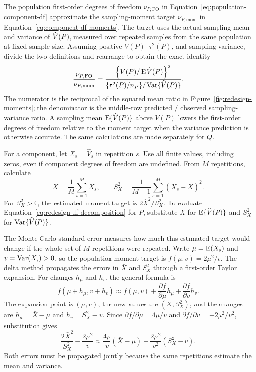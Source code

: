 The population first-order degrees of freedom
\(\nu_{P,\mathrm{FO}}\) in Equation~\eqref{eq:population-component-df}
approximate the sampling-moment target \(\nu_{P,\mathrm{mom}}\) in
Equation~\eqref{eq:component-df-moments}. The target uses the actual
sampling mean and variance of \(\widehat V(P)\), measured over repeated
samples from the same population at fixed sample size. Assuming positive
\(V(P)\), \(\tau^2(P)\), and sampling variance, divide the two
definitions and rearrange to obtain the exact identity
\begin{equation}
 \frac{\nu_{P,\mathrm{FO}}}{\nu_{P,\mathrm{mom}}}
 =\frac{\left\{V(P)/\operatorname{E}\widehat V(P)\right\}^{2}}
        {\{\tau^2(P)/n_P\}/\operatorname{Var}\{\widehat V(P)\}}.
 \label{eq:redesign-df-decomposition}
\end{equation}
The numerator is the reciprocal of the squared mean ratio in
Figure~\ref{fig:redesign-moments}; the denominator is the middle-row
predicted / observed sampling-variance ratio. A sampling mean \(\operatorname{E}\{\widehat V(P)\}\) above \(V(P)\) lowers the first-order
degrees of freedom relative to the moment target when the variance
prediction is otherwise accurate. The same calculations are made
separately for \(Q\).

\medskip
{}

For a component, let \(X_s=\widehat V_s\) in repetition \(s\). Use
all finite values, including zeros, even if component degrees of freedom
are undefined. From \(M\) repetitions, calculate
\begin{equation}
 \bar X=\frac1M\sum_{s=1}^M X_s,\qquad
 S_X^2=\frac1{M-1}\sum_{s=1}^M(X_s-\bar X)^2.
\end{equation}
For \(S_X^2>0\), the estimated moment target is \(2\bar X^2/S_X^2\).
To evaluate Equation~\eqref{eq:redesign-df-decomposition} for \(P\),
substitute \(\bar X\) for \(\operatorname{E}\{\widehat V(P)\}\) and \(S_X^2\) for
\(\operatorname{Var}\{\widehat V(P)\}\).

The Monte Carlo standard error measures how much this estimated target
would change if the whole set of \(M\) repetitions were repeated.
Write \(\mu=\operatorname{E}(X_s)\) and \(v=\operatorname{Var}(X_s)>0\), so the population
moment target is \(f(\mu,v)=2\mu^2/v\). The delta method propagates
the errors in \(\bar X\) and \(S_X^2\) through a first-order Taylor
expansion. For changes \(h_\mu\) and \(h_v\), the general formula is
\begin{equation}
 f(\mu+h_\mu,v+h_v)
 \approx f(\mu,v)
 +\frac{\partial f}{\partial\mu}h_\mu
 +\frac{\partial f}{\partial v}h_v.
\end{equation}
The expansion point is \((\mu,v)\), the new values are
\((\bar X,S_X^2)\), and the changes are
\(h_\mu=\bar X-\mu\) and \(h_v=S_X^2-v\). Since
\(\partial f/\partial\mu=4\mu/v\) and
\(\partial f/\partial v=-2\mu^2/v^2\), substitution gives
\begin{equation}
 \frac{2\bar X^2}{S_X^2}-\frac{2\mu^2}{v}
 \approx\frac{4\mu}{v}(\bar X-\mu)
       -\frac{2\mu^2}{v^2}(S_X^2-v).
 \label{eq:moment-target-taylor}
\end{equation}
Both errors must be propagated jointly because the same repetitions
estimate the mean and variance.

